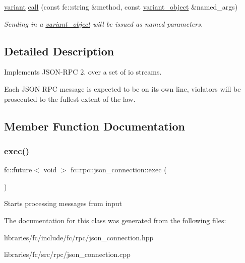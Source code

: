 \begin{Indent}
\begin{DoxyCompactItemize}
\item 
\mbox{\label{classfc_1_1rpc_1_1json__connection_a78ea9d98e14bf6ad9cf90ca949d054d4}} 
\mbox{\hyperlink{classfc_1_1variant}{variant}} \mbox{\hyperlink{classfc_1_1rpc_1_1json__connection_a78ea9d98e14bf6ad9cf90ca949d054d4}{call}} (const fc\+::string \&method, const \mbox{\hyperlink{classfc_1_1variant__object}{variant\+\_\+object}} \&named\+\_\+args)
\begin{DoxyCompactList}\small\item\em Sending in a \mbox{\hyperlink{classfc_1_1variant__object}{variant\+\_\+object}} will be issued as named parameters. \end{DoxyCompactList}\end{DoxyCompactItemize}
\end{Indent}


\subsection{Detailed Description}
Implements J\+S\+O\+N-\/\+R\+PC 2. over a set of io streams. 

Each J\+S\+ON R\+PC message is expected to be on its own line, violators will be prosecuted to the fullest extent of the law. 

\subsection{Member Function Documentation}
\mbox{\label{classfc_1_1rpc_1_1json__connection_a5d74fbf566dd9bc5ac3e7bad92a6581a}} 
\subsubsection{\texorpdfstring{exec()}{exec()}}
{\footnotesize\ttfamily fc\+::future$<$ void $>$ fc\+::rpc\+::json\+\_\+connection\+::exec (\begin{DoxyParamCaption}{ }\end{DoxyParamCaption})}

Starts processing messages from input 

The documentation for this class was generated from the following files\+:\begin{DoxyCompactItemize}
\item 
libraries/fc/include/fc/rpc/json\+\_\+connection.\+hpp\item 
libraries/fc/src/rpc/json\+\_\+connection.\+cpp\end{DoxyCompactItemize}
